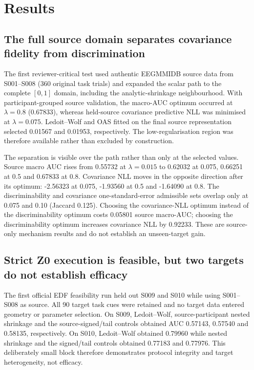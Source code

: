 \section{Results}

\subsection{The full source domain separates covariance fidelity from discrimination}
The first reviewer-critical test used authentic EEGMMIDB source data from
S001--S008 (360 original task trials) and expanded the scalar path to the
complete \([0,1]\) domain, including the analytic-shrinkage neighbourhood.
With participant-grouped source validation, the macro-AUC optimum occurred at
\(\lambda=0.8\) (0.67833), whereas held-source covariance predictive NLL was
minimised at \(\lambda=0.075\). Ledoit--Wolf and OAS fitted on the final
source representation selected 0.01567 and 0.01953, respectively. The
low-regularisation region was therefore available rather than excluded by
construction.

The separation is visible over the path rather than only at the selected
values. Source macro AUC rises from 0.55732 at \(\lambda=0.015\) to 0.62032
at 0.075, 0.66251 at 0.5 and 0.67833 at 0.8. Covariance NLL moves in the
opposite direction after its optimum: -2.56323 at 0.075, -1.93560 at 0.5 and
-1.64090 at 0.8. The discriminability and covariance one-standard-error
admissible sets overlap only at 0.075 and 0.10 (Jaccard 0.125). Choosing the
covariance-NLL optimum instead of the discriminability optimum costs 0.05801
source macro-AUC; choosing the discriminability optimum increases covariance
NLL by 0.92233. These are source-only mechanism results and do not establish
an unseen-target gain.

\subsection{Strict Z0 execution is feasible, but two targets do not establish efficacy}
The first official EDF feasibility run held out S009 and S010 while using
S001--S008 as source. All 90 target task cues were retained and no target
data entered geometry or parameter selection. On S009, Ledoit--Wolf,
source-participant nested shrinkage and the source-signed/tail controls
obtained AUC 0.57143, 0.57540 and 0.58135, respectively. On S010,
Ledoit--Wolf obtained 0.79960 while nested shrinkage and the signed/tail
controls obtained 0.77183 and 0.77976. This deliberately small block therefore
demonstrates protocol integrity and target heterogeneity, not efficacy.

